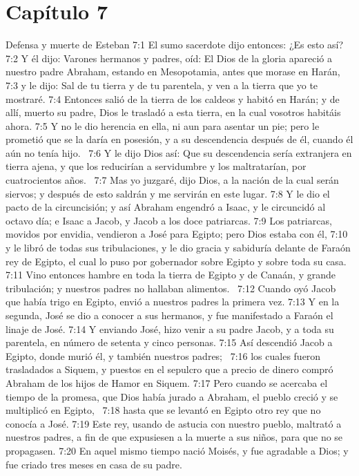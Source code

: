 \section*{Capítulo 7}
Defensa y muerte de Esteban 
7:1 El sumo sacerdote dijo entonces: ¿Es esto así?  
7:2 Y él dijo: Varones hermanos y padres, oíd: El Dios de la gloria apareció a nuestro padre Abraham, estando en Mesopotamia, antes que morase en Harán,  
7:3 y le dijo: Sal de tu tierra y de tu parentela, y ven a la tierra que yo te mostraré. 
7:4 Entonces salió de la tierra de los caldeos y habitó en Harán; y de allí, muerto su padre, Dios le trasladó a esta tierra, en la cual vosotros habitáis ahora. 
7:5 Y no le dio herencia en ella, ni aun para asentar un pie; pero le prometió que se la daría en posesión, y a su descendencia después de él, cuando él aún no tenía hijo.  
7:6 Y le dijo Dios así: Que su descendencia sería extranjera en tierra ajena, y que los reducirían a servidumbre y los maltratarían, por cuatrocientos años.  
7:7 Mas yo juzgaré, dijo Dios, a la nación de la cual serán siervos; y después de esto saldrán y me servirán en este lugar. 
7:8 Y le dio el pacto de la circuncisión; y así Abraham engendró a Isaac, y le circuncidó al octavo día; e Isaac a Jacob, y Jacob a los doce patriarcas. 
7:9 Los patriarcas, movidos por envidia, vendieron a José para Egipto; pero Dios estaba con él, 
7:10 y le libró de todas sus tribulaciones, y le dio gracia y sabiduría delante de Faraón rey de Egipto, el cual lo puso por gobernador sobre Egipto y sobre toda su casa.  
7:11 Vino entonces hambre en toda la tierra de Egipto y de Canaán, y grande tribulación; y nuestros padres no hallaban alimentos.  
7:12 Cuando oyó Jacob que había trigo en Egipto, envió a nuestros padres la primera vez. 
7:13 Y en la segunda, José se dio a conocer a sus hermanos, y fue manifestado a Faraón el linaje de José. 
7:14 Y enviando José, hizo venir a su padre Jacob, y a toda su parentela, en número de setenta y cinco personas. 
7:15 Así descendió Jacob a Egipto, donde murió él, y también nuestros padres;  
7:16 los cuales fueron trasladados a Siquem, y puestos en el sepulcro que a precio de dinero compró Abraham de los hijos de Hamor en Siquem. 
7:17 Pero cuando se acercaba el tiempo de la promesa, que Dios había jurado a Abraham, el pueblo creció y se multiplicó en Egipto,  
7:18 hasta que se levantó en Egipto otro rey que no conocía a José. 
7:19 Este rey, usando de astucia con nuestro pueblo, maltrató a nuestros padres, a fin de que expusiesen a la muerte a sus niños, para que no se propagasen. 
7:20 En aquel mismo tiempo nació Moisés, y fue agradable a Dios; y fue criado tres meses en casa de su padre. 
